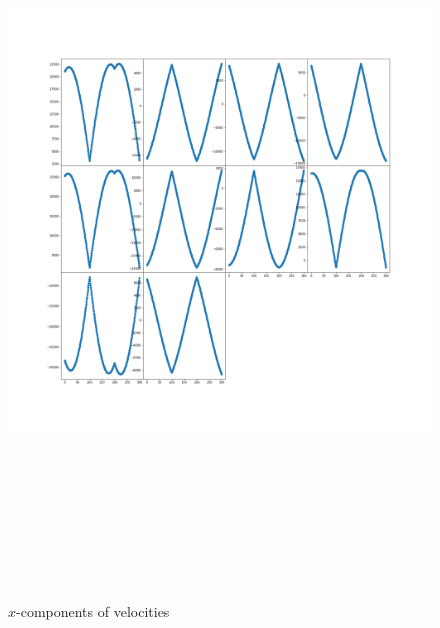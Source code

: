 \documentclass[12pt]{article}
\begin{document}
	\begin{figure}[H]
		\includegraphics[width=\linewidth, height=20cm]{subvsx3Bz.png} \caption{$x$-components of velocities} \label{subvsx3Bz}
	\end{figure}
\end{document}
